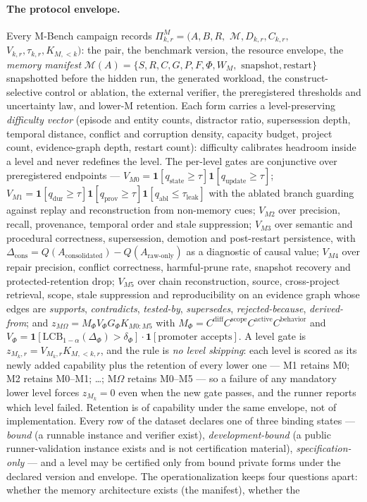 \documentclass[11pt]{article}
\theoremstyle{definition}
\begin{document}
\paragraph{The protocol envelope.} Every M-Bench campaign records $\Pi^{M}_{k,r} = (A, B, R,$ $\mathcal M, D_{k,r}, C_{k,r},$ $V_{k,r}, \tau_{k,r}, K_{M,<k})$: the pair, the benchmark version, the resource envelope, the \emph{memory manifest} $\mathcal M(A) = \{S, R, C, G, P, F, \Phi, W_M,$ $\text{snapshot}, \text{restart}\}$ snapshotted before the hidden run, the generated workload, the construct-selective control or ablation, the external verifier, the preregistered thresholds and uncertainty law, and lower-M retention. Each form carries a level-preserving \emph{difficulty vector} (episode and entity counts, distractor ratio, supersession depth, temporal distance, conflict and corruption density, capacity budget, project count, evidence-graph depth, restart count): difficulty calibrates headroom inside a level and never redefines the level. The per-level gates are conjunctive over preregistered endpoints --- $V_{M0} = \mathbf 1[q_{\mathrm{state}} \ge \tau]\mathbf 1[q_{\mathrm{update}} \ge \tau]$; $V_{M1} = \mathbf 1[q_{\mathrm{dur}} \ge \tau]\mathbf 1[q_{\mathrm{prov}} \ge \tau]\mathbf 1[q_{\mathrm{abl}} \le \tau_{\mathrm{leak}}]$ with the ablated branch guarding against replay and reconstruction from non-memory cues; $V_{M2}$ over precision, recall, provenance, temporal order and stale suppression; $V_{M3}$ over semantic and procedural correctness, supersession, demotion and post-restart persistence, with $\Delta_{\mathrm{cons}} = Q(A_{\mathrm{consolidated}}) - Q(A_{\mathrm{raw\text{-}only}})$ as a diagnostic of causal value; $V_{M4}$ over repair precision, conflict correctness, harmful-prune rate, snapshot recovery and protected-retention drop; $V_{M5}$ over chain reconstruction, source, cross-project retrieval, scope, stale suppression and reproducibility on an evidence graph whose edges are \emph{supports}, \emph{contradicts}, \emph{tested-by}, \emph{supersedes}, \emph{rejected-because}, \emph{derived-from}; and $z_{M\Omega} = M_\Phi V_\Phi G_\Phi K_{M0{:}M5}$ with $M_\Phi = C^{\mathrm{diff}}C^{\mathrm{scope}}C^{\mathrm{active}}C^{\mathrm{behavior}}$ and $V_\Phi = \mathbf 1[\mathrm{LCB}_{1-\alpha}(\Delta_\Phi) > \delta_\Phi]\cdot\mathbf 1[\text{promoter accepts}]$. A level gate is $z_{M_k,r} = V_{M_k,r} K_{M,<k,r}$, and the rule is \emph{no level skipping}: each level is scored as its newly added capability plus the retention of every lower one --- M1 retains M0; M2 retains M0--M1; \ldots; M$\Omega$ retains M0--M5 --- so a failure of any mandatory lower level forces $z_{M_k} = 0$ even when the new gate passes, and the runner reports which level failed. Retention is of capability under the same envelope, not of implementation. Every row of the dataset declares one of three binding states --- \emph{bound} (a runnable instance and verifier exist), \emph{development-bound} (a public runner-validation instance exists and is not certification material), \emph{specification-only} --- and a level may be certified only from bound private forms under the declared version and envelope. The operationalization keeps four questions apart: whether the memory architecture exists (the manifest), whether the 
\end{document}
